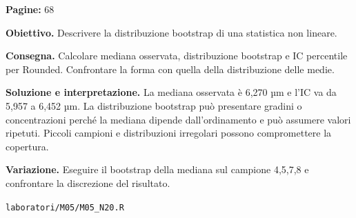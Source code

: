 \documentclass[11pt,a4paper]{article}
\begin{document}
\textbf{Pagine:} 68

\textbf{Obiettivo.} Descrivere la distribuzione bootstrap di una statistica non lineare.

\textbf{Consegna.} Calcolare mediana osservata, distribuzione bootstrap e IC percentile per Rounded. Confrontare la forma con quella della distribuzione delle medie.

\textbf{Soluzione e interpretazione.} La mediana osservata è 6,270 µm e l’IC va da 5,957 a 6,452 µm. La distribuzione bootstrap può presentare gradini o concentrazioni perché la mediana dipende dall’ordinamento e può assumere valori ripetuti. Piccoli campioni e distribuzioni irregolari possono compromettere la copertura.

\textbf{Variazione.} Eseguire il bootstrap della mediana sul campione 4,5,7,8 e confrontare la discrezione del risultato.

\texttt{laboratori/M05/M05\_N20.R}
\end{document}
